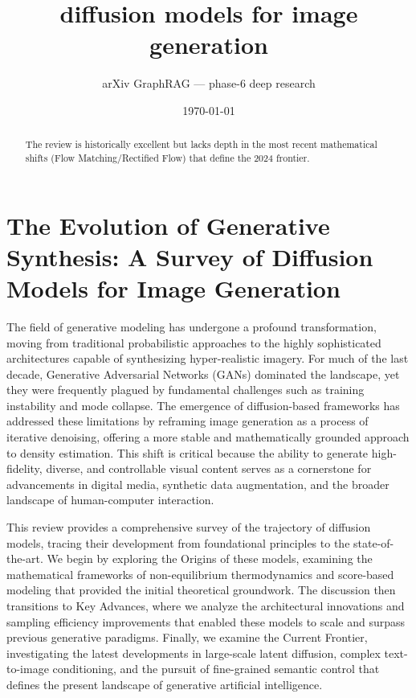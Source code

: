 \documentclass[11pt]{article}
\title{diffusion models for image generation}
\author{arXiv GraphRAG --- phase-6 deep research}
\date{\today}
\begin{document}
\maketitle

\begin{abstract}
The review is historically excellent but lacks depth in the most recent mathematical shifts (Flow Matching/Rectified Flow) that define the 2024 frontier.
\end{abstract}

\section{The Evolution of Generative Synthesis: A Survey of Diffusion Models for Image Generation}

The field of generative modeling has undergone a profound transformation, moving from traditional probabilistic approaches to the highly sophisticated architectures capable of synthesizing hyper-realistic imagery. For much of the last decade, Generative Adversarial Networks (GANs) dominated the landscape, yet they were frequently plagued by fundamental challenges such as training instability and mode collapse. The emergence of diffusion-based frameworks has addressed these limitations by reframing image generation as a process of iterative denoising, offering a more stable and mathematically grounded approach to density estimation. This shift is critical because the ability to generate high-fidelity, diverse, and controllable visual content serves as a cornerstone for advancements in digital media, synthetic data augmentation, and the broader landscape of human-computer interaction.

This review provides a comprehensive survey of the trajectory of diffusion models, tracing their development from foundational principles to the state-of-the-art. We begin by exploring the Origins of these models, examining the mathematical frameworks of non-equilibrium thermodynamics and score-based modeling that provided the initial theoretical groundwork. The discussion then transitions to Key Advances, where we analyze the architectural innovations and sampling efficiency improvements that enabled these models to scale and surpass previous generative paradigms. Finally, we examine the Current Frontier, investigating the latest developments in large-scale latent diffusion, complex text-to-image conditioning, and the pursuit of fine-grained semantic control that defines the present landscape of generative artificial intelligence.
\end{document}
